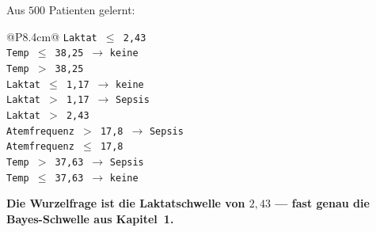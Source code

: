 \begin{merksatz}
Aus $500$ Patienten gelernt:
\begin{center}
{\small
\renewcommand{\arraystretch}{1.36}
\begin{tabular}{@{}P{8.4cm}@{}}
\toprule
\texttt{Laktat $\le$ 2,43}\\
\quad\texttt{Temp $\le$ 38,25}\ $\to$ \texttt{keine}\\
\quad\texttt{Temp $>$ 38,25}\\
\qquad\texttt{Laktat $\le$ 1,17}\ $\to$ \texttt{keine}\\
\qquad\texttt{Laktat $>$ 1,17}\ $\to$ \texttt{Sepsis}\\
\texttt{Laktat $>$ 2,43}\\
\quad\texttt{Atemfrequenz $>$ 17,8}\ $\to$ \texttt{Sepsis}\\
\quad\texttt{Atemfrequenz $\le$ 17,8}\\
\qquad\texttt{Temp $>$ 37,63}\ $\to$ \texttt{Sepsis}\\
\qquad\texttt{Temp $\le$ 37,63}\ $\to$ \texttt{keine}\\
\bottomrule
\end{tabular}}
\end{center}

\begin{center}
\begin{minipage}{0.9\textwidth}
\textbf{Die Wurzelfrage ist die Laktatschwelle von $2{,}43$ --- fast genau die Bayes-Schwelle aus Kapitel~1.}
\end{minipage}
\end{center}

\begin{center}
\begin{minipage}{0.88\textwidth}
\end{minipage}
\end{center}
\end{merksatz}

